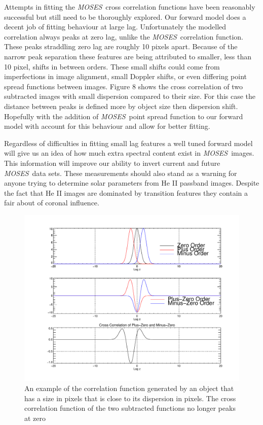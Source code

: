 \documentclass[]{aastex6}
\newcommand{\MOSES}{\textit{MOSES}}
\begin{document}
Attempts in fitting the \MOSES \ cross correlation functions have been reasonably successful but still need to be thoroughly explored.  Our forward model does a decent job of fitting behaviour at large lag.  Unfortunately the modelled correlation always peaks at zero lag, unlike the \MOSES \ correlation function.  These peaks straddling zero lag are roughly 10 pixels apart. Because of the narrow peak separation these features are being attributed to smaller, less than 10 pixel, shifts in between orders.  These small shifts could come from imperfections in image alignment, small Doppler shifts, or even differing point spread functions between images.  Figure 8 shows the cross correlation of two subtracted images with small dispersion compared to their size.  For this case the distance between peaks is defined more by object size then dispersion shift.  Hopefully with the addition of \MOSES \ point spread function to our forward model with account for this behaviour and allow for better fitting.

Regardless of difficulties in fitting small lag features a well tuned forward model will give us an idea of how much extra spectral content exist in \MOSES \ images.  This information will improve our ability to invert current and future \MOSES \ data sets.  These measurements should also stand as a warning for anyone trying to determine solar parameters from He II passband images.  Despite the fact that He II images are dominated by transition features they contain a fair about of coronal influence.



\begin{figure}[t]
\centering
\includegraphics[scale=.5]{images/test2.pdf}
\caption{An example of the correlation function generated by an object that has a size in pixels that is close to its dispersion in pixels.  The cross correlation function of the two subtracted functions no longer peaks at zero}
\end{figure}	
\end{document}
